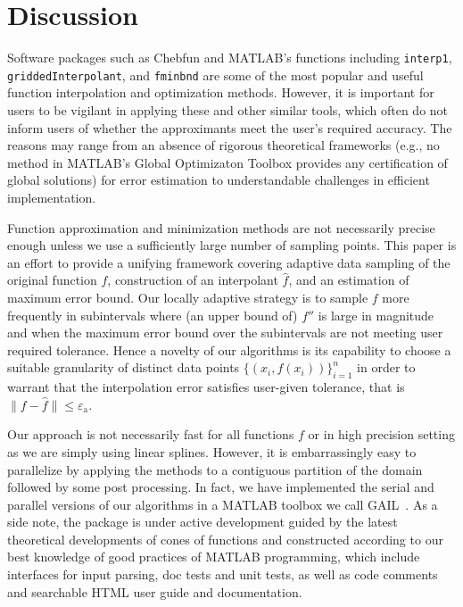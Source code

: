 \documentclass[review]{elsarticle}
\newcommand{\abstol}{\varepsilon_{\textrm{a}}}
\theoremstyle{definition}
\begin{document}
\section{Discussion}

Software packages such as Chebfun and MATLAB's functions including
\texttt{interp1}, \texttt{griddedInterpolant}, and \texttt{fminbnd} are some of
the most popular and useful function interpolation and optimization methods.
However, it is important for users to be vigilant in applying these and other
similar tools, which often do not inform users of whether the approximants meet
the user's required accuracy. The reasons may range from an absence of rigorous
theoretical frameworks (e.g., no method in MATLAB's Global Optimizaton Toolbox
provides any certification of global solutions) for error estimation to
understandable challenges in efficient implementation.

Function approximation and minimization methods are not necessarily precise
enough unless we use a sufficiently large number of sampling points. This paper
is an effort to provide a unifying framework covering adaptive data sampling of
the original function $f$, construction of an interpolant $\hat{f}$, and an
estimation of maximum error bound. Our locally adaptive strategy is to sample
$f$ more frequently in subintervals where (an upper bound of) $f''$ is large in
magnitude and when the maximum error bound over the subintervals are not meeting
user required tolerance. Hence a novelty of our algorithms is its capability to
choose a suitable granularity of distinct data points $\{(x_i,
f(x_i))\}_{i=1}^n$ in order to warrant that the interpolation error satisfies
user-given tolerance, that is $\| f - \hat{f} \| \le \abstol$.

Our approach is not necessarily fast for all functions $f$ or in high precision
setting as we are simply using linear splines. However, it is embarrassingly
easy to parallelize by applying the methods to a contiguous partition of the
domain followed by some post processing. In fact, we have implemented the serial
and parallel versions of our algorithms in a MATLAB toolbox we call
GAIL~\cite{ChoEtal15a}. As a side note, the package is under active development
guided by the latest theoretical developments of cones of functions and
constructed according to our best knowledge of good practices of MATLAB
programming, which include interfaces for input parsing, doc tests and unit
tests, as well as code comments and searchable HTML user guide and
documentation.
\end{document}
